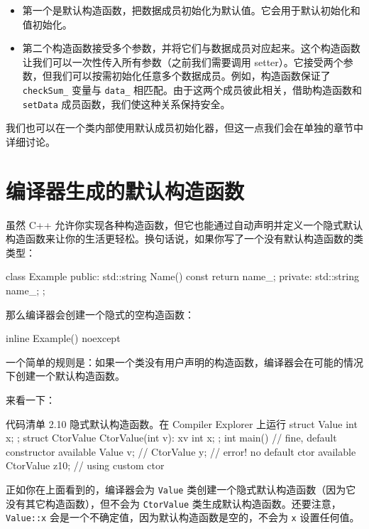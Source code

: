 \begin{itemize}
\item 第一个是默认构造函数，把数据成员初始化为默认值。它会用于默认初始化和值初始化。
\item 第二个构造函数接受多个参数，并将它们与数据成员对应起来。这个构造函数让我们可以一次性传入所有参数（之前我们需要调用 setter）。它接受两个参数，但我们可以按需初始化任意多个数据成员。例如，构造函数保证了 \texttt{checkSum\_} 变量与 \texttt{data\_} 相匹配。由于这两个成员彼此相关，借助构造函数和 \texttt{setData} 成员函数，我们使这种关系保持安全。
\end{itemize}

我们也可以在一个类内部使用默认成员初始化器，但这一点我们会在单独的章节中详细讨论。

\section{编译器生成的默认构造函数}

虽然 C++ 允许你实现各种构造函数，但它也能通过自动声明并定义一个隐式默认构造函数来让你的生活更轻松。换句话说，如果你写了一个没有默认构造函数的类类型：

\begin{codebox}[cpp]
class Example {
public:
std::string Name() const { return name_; }
private:
std::string name_;
};
\end{codebox}

那么编译器会创建一个隐式的空构造函数：

\begin{codebox}[cpp]
inline Example() noexcept { }
\end{codebox}

一个简单的规则是：如果一个类没有用户声明的构造函数，编译器会在可能的情况下创建一个默认构造函数。

来看一下：

\begin{codeboxt}[cpp]{代码清单 2.10 隐式默认构造函数。在 Compiler Explorer 上运行}
struct Value {
int x;
};
struct CtorValue {
CtorValue(int v): x{v} { }
int x;
};
int main() {
// fine, default constructor available
Value v;
// CtorValue y;
// error! no default ctor available
CtorValue z{10}; // using custom ctor
}
\end{codeboxt}

正如你在上面看到的，编译器会为 \texttt{Value} 类创建一个隐式默认构造函数（因为它没有其它构造函数），但不会为 \texttt{CtorValue} 类生成默认构造函数。还要注意，\texttt{Value::x} 会是一个不确定值，因为默认构造函数是空的，不会为 \texttt{x} 设置任何值。

